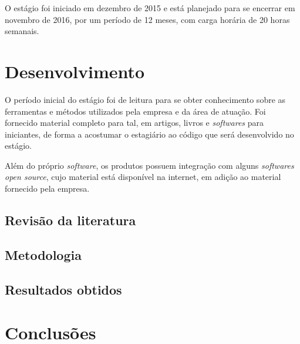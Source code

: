 \documentclass[12pt]{article}
\begin{document}
O estágio foi iniciado em dezembro de 2015 e está planejado para se encerrar em
novembro de 2016, por um período de 12 meses, com carga horária de 20 horas
semanais.

\section{Desenvolvimento}

O período inicial do estágio foi de leitura para se obter conhecimento sobre
as ferramentas e métodos utilizados pela empresa e da área de atuação. Foi
fornecido material completo para tal, em artigos, livros e \textit{softwares}
para iniciantes, de forma a acostumar o estagiário ao código que será
desenvolvido no estágio.

Além do próprio \textit{software}, os produtos possuem integração com alguns
\textit{softwares open source}, cujo material está disponível na internet, em
adição ao material fornecido pela empresa.

\subsection{Revisão da literatura}

\subsection{Metodologia}

\subsection{Resultados obtidos}

\section{Conclusões}

%
%
\end{document}
